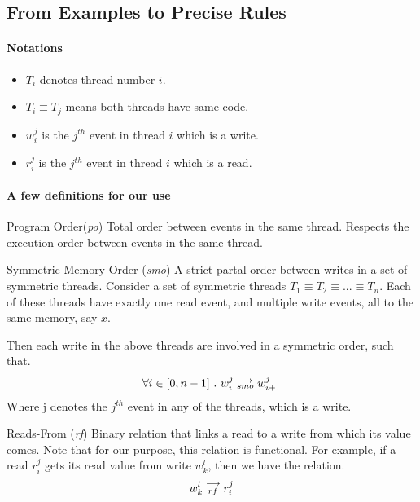 \subsection{From Examples to Precise Rules}

    \paragraph{Notations}
        \begin{itemize}
            \item $T_i$ denotes thread number $i$.
            \item $T_i \equiv T_j$ means both threads have same code.
            \item $w_i^j$ is the $j^{th}$ event in thread $i$ which is a write.
            \item $r_i^j$ is the $j^{th}$ event in thread $i$ which is a read. 
        \end{itemize}

    
    \paragraph{A few definitions for our use}

    \begin{definition}{Program Order(\emph{po})}
        Total order between events in the same thread. Respects the execution order between events in the same thread. 
    \end{definition}

    \begin{definition}{Symmetric Memory Order (\emph{smo})}
        A strict partal order between writes in a set of symmetric threads. Consider a set of symmetric threads $T_1 \equiv T_2 \equiv ... \equiv T_n$. Each of these threads have exactly one read event, and multiple write events, all to the same memory, say $x$. 

        Then each write in the above threads are involved in a symmetric order, such that. 
        \begin{align*}
            \forall i \in [0, n-1] \ . \ w_i^j\stackrel{\longrightarrow}{_{smo}}w_{i+1}^j
        \end{align*}
        Where j denotes the $j^{th}$ event in any of the threads, which is a write.
    \end{definition}


    \begin{definition}{Reads-From (\emph{rf})}
        Binary relation that links a read to a write from which its value comes. Note that for our purpose, this relation is functional.
        For example, if a read $r_i^j$ gets its read value from write $w_k^l$, then we have the relation. 
        \begin{align*}
            w_k^l\stackrel{\longrightarrow}{_{rf}}r_i^j
        \end{align*}
    \end{definition}

